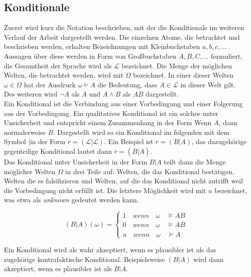 \documentclass[12pt,a4paper]{article}
\newcommand{\lag}{\mathcal{L}}
\begin{document}
\subsection{Konditionale}
Zuerst wird kurz die Notation beschrieben, mit der die Konditionale im weiteren Verlauf der Arbeit dargestellt werden. Die einzelnen Atome, die betrachtet und beschrieben werden, erhalten Bezeichnungen mit Kleinbuchstaben $a, b, c,...\ $. Aussagen über diese werden in Form von Großbuchstaben $A, B, C,...$ formuliert, die Gesamtheit der Sprache wird als $\lag$ bezeichnet. Die Menge der möglichen Welten, die betrachtet werden, wird mit $\Omega$ bezeichnet. In einer dieser Welten $\omega \in \Omega$  hat der Ausdruck $\omega \models A$ die Bedeutung, dass $A \in \lag$ in dieser Welt gilt. Des weiteren wird $\neg A$ als $\overline{A}$ und $A \wedge B$ als $AB$ dargestellt.\\
Ein Konditional ist die Verbindung aus einer Vorbedingung und einer Folgerung aus der Vorbedingung. Ein qualitatives Konditional ist ein solches unter  Unsicherheit und entspricht einem Zusammenhang in der Form \glqq Wenn $A$, dann normalerweise $B$\grqq . Dargestellt wird so ein Konditional  im folgenden mit dem Symbol \glqq$|$\grqq \space in der Form $r = ( \lag | \lag)$. Ein Beispiel ist $r = (B|A)$, das dazugehörige gegenteilige Konditional lautet dann $\overline{r} = (\overline{B}|A)$.\\
Das Konditional unter Unsicherheit in der Form $B|A$ teilt dann die Menge möglicher Welten $\Omega$ in drei Teile auf: Welten, die das Konditional bestätigen, Welten die es falsifizieren und Welten, auf die das Konditional nicht zutrifft weil die Vorbedingung nicht erfüllt ist. Die letztere Möglichkeit wird mit $u$ bezeichnet, was etwa als \textit{unknown} gedeutet werden kann.

\[
  (B|A)(\omega)=\begin{cases}
               1 \quad wenn \quad \omega \quad \models AB\\
               0 \quad wenn \quad \omega \quad \models A\overline{B}\\
               u \quad wenn \quad \omega \quad \models \overline{A}
            \end{cases}
\]

Ein Konditional wird als wahr akzeptiert, wenn es plausibler ist als das zugehörige kontrafaktische Konditional. Beispielsweise $(B|A)$ wird dann akzeptiert, wenn es plausibler ist als $\overline{B}|A$.
\end{document}

